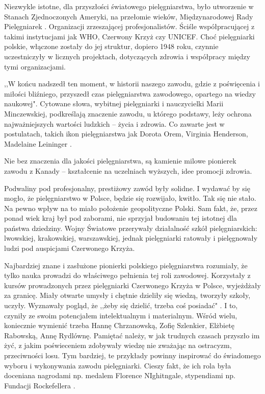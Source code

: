 \documentclass[a4paper,12pt,twoside,openright]{mwrep}
\begin{document}
Niezwykle istotne, dla przyszłości światowego pielęgniarstwa, było utworzenie w Stanach Zjednoczonych Ameryki, na przełomie wieków, Międzynarodowej Rady Pielęgniarek \cite{rada}. Organizacji zrzeszającej profesjonalistów. Ściśle współpracującej z takimi instytucjami jak WHO, Czerwony Krzyż czy UNICEF. Choć pielęgniarki polskie, włączone zostały do jej struktur, dopiero 1948 roku, czynnie uczestniczyły w licznych projektach, dotyczących zdrowia i współpracy między tymi organizacjami.

,,W końcu nadszedł ten moment, w historii naszego zawodu, gdzie z poświęcenia i miłości bliźniego, przyszedł czas pielęgniarstwa zawodowego, opartego na wiedzy naukowej". Cytowane słowa, wybitnej pielęgniarki i nauczycielki Marii Minczewskiej, podkreślają znaczenie zawodu, u którego podstawy, leży  ochrona najważniejszych wartości ludzkich – życia i zdrowia.  Co zawarte jest w postulatach, takich ikon pielęgniarstwa jak Dorota Orem, Virginia Henderson, Madelaine Leininger \cite{ikon}.

Nie bez znaczenia dla jakości pielęgniarstwa, są kamienie milowe pionierek zawodu z Kanady – kształcenie na uczelniach wyższych, idee promocji zdrowia.

Podwaliny pod profesjonalny, prestiżowy zawód były solidne. I wydawać by się mogło, że pielęgniarstwo w Polsce, będzie się rozwijało, kwitło. Tak się nie stało. Na pewno wpływ na to miało położenie geopolityczne Polski. Sam fakt, że, przez ponad wiek kraj był pod zaborami, nie sprzyjał budowaniu tej istotnej dla państwa dziedziny. Wojny Światowe przerywały działalność szkół pielęgniarskich: lwowskiej, krakowskiej, warszawskiej, jednak pielęgniarki ratowały i pielęgnowały ludzi pod auspicjami Czerwonego Krzyża.

Najbardziej znane i zasłużone pionierki polskiego pielęgniarstwa rozumiały, że tylko nauka prowadzi do właściwego pełnienia tej roli zawodowej. Korzystały z kursów prowadzonych przez pielęgniarki Czerwonego Krzyża  w Polsce, wyjeżdżały za granicę. Miały otwarte umysły i chętnie dzieliły się wiedzą, tworzyły szkoły, uczyły.  Wyznawały pogląd, że ,,żeby się dzielić, trzeba coś posiadać" \cite{ikonpol}. I to, czyniły ze swoim potencjałem intelektualnym i materialnym. Wśród wielu, koniecznie wymienić trzeba Hannę Chrzanowską, Zofię Szlenkier, Elżbietę Rabowską, Annę Rydlównę. Pamiętać należy, w jak trudnych czasach przyszło im żyć, z jakim poświeceniem zdobywały wiedzę nie zważając na ostracyzm, przeciwności losu. Tym bardziej, te przykłady powinny inspirować do świadomego wyboru i wykonywania zawodu pielęgniarki. Cieszy fakt, że ich rola była doceniana nagrodami np. medalem Florence NIghitngale, stypendiami np. Fundacji Rockefellera \cite{50}.
\end{document}
